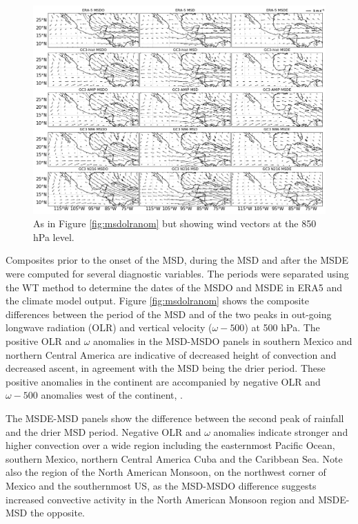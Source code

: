  \begin{figure}[t!]
\includegraphics[width=\linewidth]{figures/modcompar_dif2u3}
\caption{As in Figure \ref{fig:msdolranom} but showing wind vectors at the 850 hPa level. }
\label{fig:msduanom}
\end{figure}


Composites prior to the onset of the MSD, during the MSD and after the MSDE were computed for several diagnostic variables. The periods were separated using the WT method to determine the dates of the MSDO and MSDE in ERA5 and the climate model output.
Figure \ref{fig:msdolranom} shows the composite differences between the period of the MSD and of the two peaks in out-going longwave radiation (OLR) and vertical velocity ($\omega-500$) at 500 hPa.
The positive OLR and $\omega$ anomalies in the MSD-MSDO panels in southern Mexico and northern Central America are indicative of decreased height of convection and decreased ascent, in agreement with the MSD being the drier period. These positive anomalies in the continent are accompanied by negative OLR and $\omega-500$ anomalies west of the continent, . 


The MSDE-MSD panels show the difference between the second peak of rainfall and the drier MSD period. Negative OLR and $\omega$ anomalies indicate stronger and higher convection over a wide region including the easternmost Pacific Ocean, southern Mexico, northern Central America Cuba and the Caribbean Sea.  
Note also the region of the North American Monsoon, on the northwest corner of Mexico and the southernmost US, as the MSD-MSDO difference suggests increased convective activity in the North American Monsoon region and 
MSDE-MSD the opposite. 

